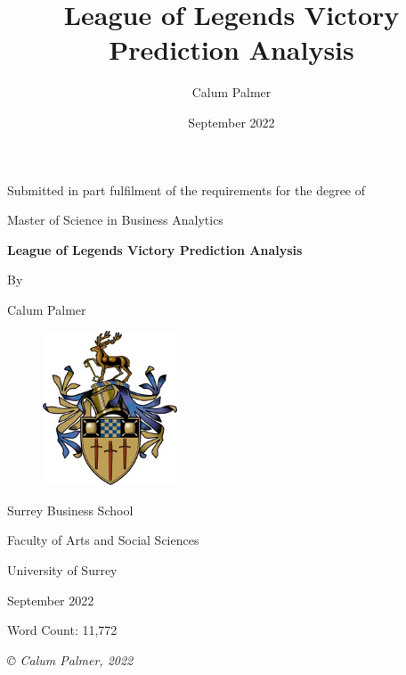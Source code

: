 \documentclass[12pt,a4 paper]{report}
\title{League of Legends Victory Prediction Analysis}
\author{Calum Palmer}
\date{September 2022}
\begin{document}
    \begin{titlepage}
    \centering
        {\large Submitted in part fulfilment of the requirements for the degree of}


        {\Large Master of Science in Business Analytics}

    \vspace{1.5cm}
        {\huge\bfseries League of Legends Victory Prediction Analysis}

    \vspace{1cm}
        {By}

    \vspace{0.5cm}
        {\Large Calum Palmer}

    \vspace{0.25cm}
    \begin{figure}[h]
        \centering
        \includegraphics[width=4cm]{figures/SurreyCrest}
    \end{figure}

    \vspace{0.25cm}
        {\large Surrey Business School}

    \vspace{0.25cm}
        {\large Faculty of Arts and Social Sciences}

    \vspace{0.25cm}
        {\large University of Surrey}

    \vspace{1cm}
        {\large September 2022}

    \vspace{1cm}
        {\large Word Count: 11,772}

    \vfill
        {\itshape © Calum Palmer, 2022}

    \end{titlepage}

    \setcounter{page}{2}
\end{document}
